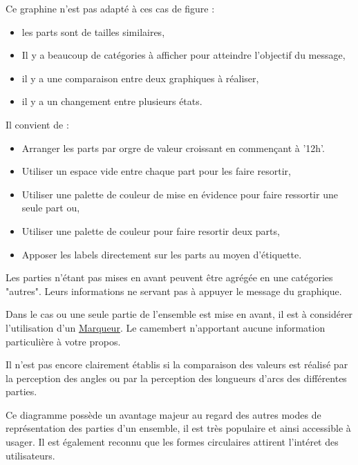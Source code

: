 \documentclass[a4paper,12pt]{article}
\begin{document}
\begin{multicols}{2}
Ce graphine n'est pas adapté à ces cas de figure :
\begin{itemize}
\item les parts sont de tailles similaires,\autocite{sosulskiGraphics2019}
\item Il y a beaucoup de catégories à afficher pour atteindre l'objectif du message,
\item il y a une comparaison entre deux graphiques à réaliser,\autocite{jonathanschwabishParttowhole2021}
\item il y a un changement entre plusieurs états.\autocite{wilkeDirectoryVisualizations2019}
\end{itemize}

Il convient de :
\begin{itemize}
\item Arranger les parts par orgre de valeur croissant en commençant à '12h'. \autocite{jonathanschwabishParttowhole2021}
\item Utiliser un espace vide entre chaque part pour les faire resortir, \autocite{sosulskiGraphics2019}
\item Utiliser une palette de couleur de mise en évidence pour faire ressortir une seule part ou,
\item Utiliser une palette de couleur pour faire resortir deux parts,
\item Apposer les labels directement sur les parts au moyen d'étiquette. \autocite{sosulskiGraphics2019}
\end{itemize}

Les parties n'étant pas mises en avant peuvent être agrégée en une catégories "autres". Leurs informations ne servant pas à appuyer le message du graphique. \autocite{jonathanschwabishParttowhole2021}

Dans le cas ou une seule partie de l'ensemble est mise en avant, il est à considérer l'utilisation d'un \hyperref[sec:org9125090]{Marqueur}. Le camembert n'apportant aucune information particulière à votre propos.

Il n'est pas encore clairement établis si la comparaison des valeurs est réalisé par la perception des angles ou par la perception des longueurs d'arcs des différentes parties.\autocite{jonathanschwabishParttowhole2021}

Ce diagramme possède un avantage majeur au regard des autres modes de représentation des parties d'un ensemble, il est très populaire et ainsi accessible à usager. \autocite{jonathanschwabishParttowhole2021} Il est également reconnu que les formes circulaires attirent l'intéret des utilisateurs.\autocite{jonathanschwabishParttowhole2021}

\end{multicols}
\end{document}
